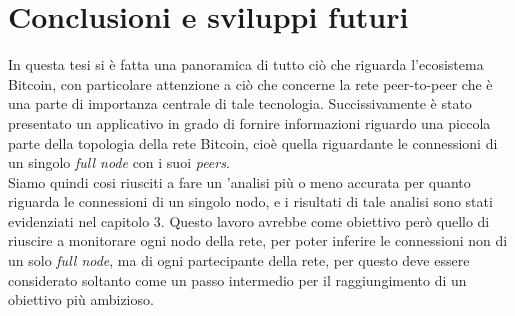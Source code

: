 \chapter{Conclusioni e sviluppi futuri}
In questa tesi si \`e fatta una panoramica di tutto ci\`o che riguarda l'ecosistema Bitcoin, con particolare attenzione a ci\`o che concerne la rete peer-to-peer che \`e una parte di importanza centrale di tale tecnologia. Succissivamente \`e stato presentato un applicativo in grado di fornire informazioni riguardo una piccola parte della topologia della rete Bitcoin, cio\`e quella riguardante le connessioni di un singolo \textit{full node} con i suoi \textit{peers}. \\
Siamo quindi cosi riusciti a fare un 'analisi pi\`u o meno accurata per quanto riguarda le connessioni di un singolo nodo, e i risultati di tale analisi sono stati evidenziati nel capitolo 3.
Questo lavoro avrebbe come obiettivo per\`o quello di riuscire a monitorare ogni nodo della rete, per poter inferire le connessioni non di un solo \textit{full node}, ma di ogni partecipante della rete, per questo deve essere considerato soltanto come un passo intermedio per il raggiungimento di un obiettivo pi\`u ambizioso.